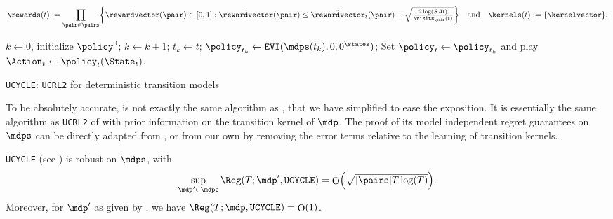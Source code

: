 \documentclass[preprint,cleveref,12pt]{colt2025}
\DeclarePairedDelimiter{\braces}{\{}{\}}	%
\DeclarePairedDelimiter{\parens}{(}{)}	%
\DeclarePairedDelimiter{\abs}{\lvert}{\rvert}	%
\newcommand{\tsqrt}[1]{{\textstyle\sqrt{#1}}} %
\DeclareMathOperator*{\OH}{\mathrm{O}}
\def\model{\mdp}
\def\models{\mdps}
\def\kernel{\kernelvector}
\def\reward{\rewardvector}
\begin{document}
    \begin{algorithm}[H]
        \begin{equation*}
            \rewards(t)
            := 
            \prod_{\pair \in \pairs} 
            \braces*{
                \tilde{\reward}(\pair) \in [0, 1]
                :
                \tilde{\reward}(\pair) 
                \le 
                \hat{\reward}_t(\pair) + \sqrt{\tfrac{2 \log(SAt)}{\visits_\pair(t)}}
            }
            \quad \textrm{and} \quad
            \kernels(t) := \braces*{\kernel}
            .
        \end{equation*}
        \begin{algorithmic}[1]
            \STATE $k \gets 0$, initialize $\policy^0$;
                    \STATE
                        $k \gets k+1$; $t_k \gets t$;
                    \STATE 
                        $\policy_{t_k} \gets \texttt{EVI}(\models(t_k), 0, 0^\states)$;
                \ENDIF
                \STATE
                    Set $\policy_t \gets \policy_{t_k}$ and play $\Action_t \gets \policy_t(\State_t)$.
            \ENDFOR
        \end{algorithmic}
        \caption{
            \label{algorithm_ucycle}
            \texttt{UCYCLE}: \texttt{UCRL2} for deterministic transition models
        }
    \end{algorithm}

    To be absolutely accurate,  is not exactly the same algorithm as \cite{ortner_online_2010}, that we have simplified to ease the exposition. 
    It is essentially the same algorithm as \texttt{UCRL2} of \cite{auer_near_optimal_2009} with prior information on the transition kernel of $\model$. 
    The proof of its model independent regret guarantees on $\models$ can be directly adapted from \cite{ortner_online_2010}, or from our own  by removing the error terms relative to the learning of transition kernels.

    \begin{proposition}
    \label{proposition_bounded_regret}
        \texttt{UCYCLE} (see ) is robust on $\models$, with
        \begin{equation*}
            \sup_{\model' \in \models} \Reg(T; \model', \texttt{UCYCLE}) 
            = 
            \OH\parens*{
                \tsqrt{\abs{\pairs} T \log(T)}
            }
            .
        \end{equation*}
        Moreover, for $\model'$ as given by , we have $\Reg(T; \model, \texttt{UCYCLE}) = \OH(1)$.
    \end{proposition}
\end{document}
